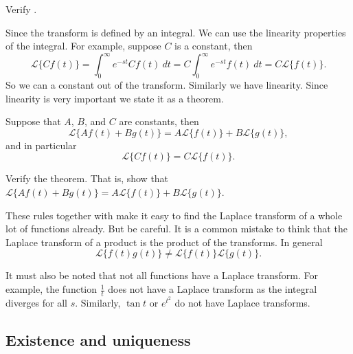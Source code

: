 \begin{exercise}
Verify .
\end{exercise}

Since the transform is defined by an integral.  We can use the linearity
properties of the integral.  For example, suppose $C$ is a constant, then
\begin{equation*}
\mathcal{L} \{ C f(t) \} =
\int_0^\infty e^{-st} C f(t) ~dt =
C \int_0^\infty e^{-st} f(t) ~dt =
C \mathcal{L} \{ f(t) \} .
\end{equation*}
So we can  a constant out of the transform.  Similarly  we have
linearity.
Since linearity is very important we state it as a theorem.

\begin{theorem}
Suppose that $A$, $B$, and $C$ are constants, then
\begin{equation*}
\boxed{~~
\mathcal{L} \{ A f(t) + B g(t) \} =
A \mathcal{L} \{ f(t) \} +
B \mathcal{L} \{ g(t) \} ,
~~}
\end{equation*}
and in particular
\begin{equation*}
\mathcal{L} \{ C f(t) \} =
C \mathcal{L} \{ f(t) \} .
\end{equation*}
\end{theorem}

\begin{exercise}
Verify the theorem.  That is, show that
$\mathcal{L} \{ A f(t) + B g(t) \} =
A \mathcal{L} \{ f(t) \} +
B \mathcal{L} \{ g(t) \}$.
\end{exercise}

These rules together with  make it easy to find
the Laplace transform of a whole lot of functions already.
But be careful.
It is a common mistake to think that the Laplace transform of a product
is the product of the transforms.  In general 
\begin{equation*}
\mathcal{L} \{ f(t) g(t) \} \not=
\mathcal{L} \{ f(t) \}
\mathcal{L} \{ g(t) \} .
\end{equation*}

It must also be noted that not all functions have a Laplace transform.  For
example, the function $\frac{1}{t}$ does not have a Laplace transform as the
integral diverges for all $s$.  Similarly,
$\tan t$ or $e^{t^2}$ do not have Laplace transforms.

\subsection{Existence and uniqueness}


